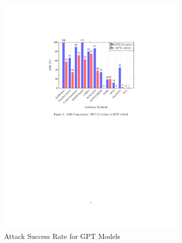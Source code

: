 \documentclass[18pt]{article}
\begin{document}
\begin{itemize}
	\begin{figure}[H]
		\centering
		\begin{subfigure}[b]{0.48\textwidth}
			\centering
			\includegraphics[width=\textwidth]{Pic_Turjo/GPT_comparison.pdf}
			\caption{Attack Success Rate for GPT Models}
			\label{fig:GPT_Comparison}
		\end{subfigure}
		\hfill
		\begin{subfigure}[b]{0.48\textwidth}
			\centering

\end{subfigure}
\end{figure}
\end{itemize}
\end{document}
